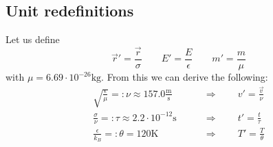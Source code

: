 \subsection{Unit redefinitions}
    Let us define
    \begin{equation}\label{redef1}
        \vec{r}'=\frac{\vec{r}}{\sigma} \qquad 
        E'=\frac{E}{\epsilon} \qquad 
        m'=\frac{m}{\mu}
    \end{equation}
    with $\mu=6.69\cdot 10^{-26}\mathrm{kg}$. 
    From this we can derive the following:
    \begin{align}
        \sqrt{\frac{\epsilon}{\mu}}
        =:\nu \approx 157.0 \frac{\mathrm{m}}{\mathrm{s}}
        \qquad&\Rightarrow\qquad v'=\frac{\vec{v}}{\nu}
        \label{redef_v} \\
        \frac{\sigma}{\nu}
        =:\tau \approx2.2\cdot10^{-12}\mathrm{s}
        \qquad&\Rightarrow\qquad t'=\frac{t}{\tau}
        \label{redef_t} \\
        \frac{\epsilon}{k_B}=:\theta=120\mathrm{K}
        \qquad&\Rightarrow\qquad T'=\frac{T}{\theta}
        \label{redef_T}
    \end{align}

